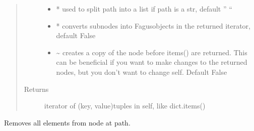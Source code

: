 \documentclass[a4paper,10pt,english]{sphinxmanual}
\begin{document}
\begin{fulllineitems}
\begin{fulllineitems}
\begin{quote}
\begin{description}
\begin{itemize}
\item {}
\sphinxAtStartPar
{} \textendash{} * used to split path into a list if path is a str, default ” “

\item {}
\sphinxAtStartPar
{} \textendash{} * converts sub\sphinxhyphen{}nodes into Fagus\sphinxhyphen{}objects in the returned iterator, default False

\item {}
\sphinxAtStartPar
{} \textendash{} \textasciitilde{} creates a copy of the node before items() are returned. This can be beneficial if you want to make
changes to the returned nodes, but you don’t want to change self. Default False

\end{itemize}

\item[{Returns}] \leavevmode
\sphinxAtStartPar
iterator of (key, value)\sphinxhyphen{}tuples in self, like dict.items()

\end{description}\end{quote}

\end{fulllineitems}


\begin{fulllineitems}
\label{\detokenize{fagus:fagus.Fagus.clear}}
\pysigstartsignatures
{}
\pysigstopsignatures
\sphinxAtStartPar
Removes all elements from node at path.


\end{fulllineitems}
\end{fulllineitems}
\end{document}
